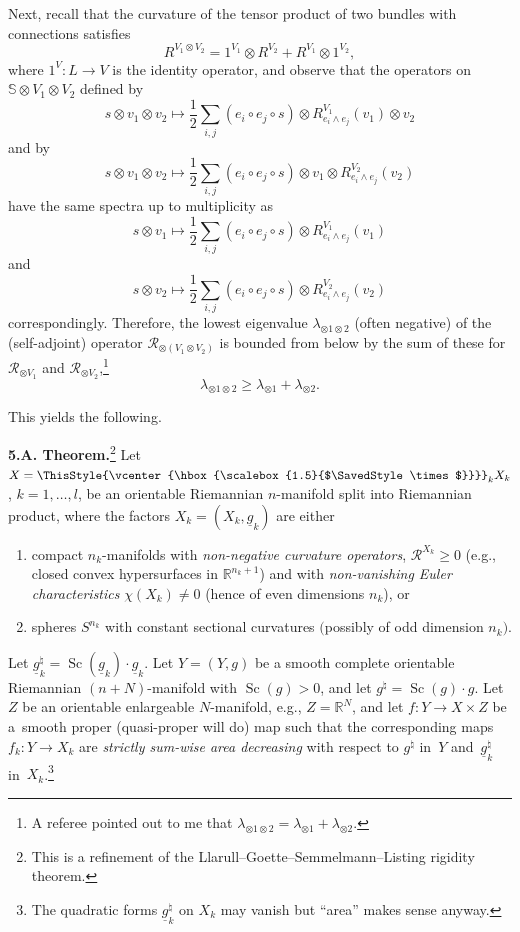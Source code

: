 \documentclass[10pt,a4paper]{amsart}
\numberwithin{equation}{section}
\newcommand\bigtimes{\mathbin{\ThisStyle{\vcenter{\hbox{%
\scalebox{1.5}{$\SavedStyle\times$}}}}}}
\begin{document}
Next, recall that the curvature of the tensor product of two bundles with connections satisfies
\[
R^{V_1\otimes V_2}=1^{V_1}\otimes R^{ V_2}+R^{V_1}\otimes 1^{V_2},
\]
where $1^V\colon L\to V$ is the identity operator, and observe that
 the operators on $\mathbb S\otimes V_1\otimes V_2$ defined by
\[
s\otimes v_1\otimes v_2\mapsto \frac {1}{2}\sum_{i,j}(e_i\circ e_j\circ s)
 \otimes R^{V_1}_{e_i\wedge e_j}(v_1)\otimes v_2
 \]
and by
\[
s\otimes v_1\otimes v_2\mapsto \frac {1}{2}\sum_{i,j}(e_i\circ e_j\circ s)
 \otimes v_1\otimes R^{V_2}_{e_i\wedge e_j}(v_2)
 \]
have the same spectra up to multiplicity as
\[
s\otimes v_1\mapsto \frac {1}{2}\sum_{i,j}(e_i\circ e_j\circ s) \otimes R^{V_1}_{e_i\wedge e_j}(v_1)
\]
and
\[
s\otimes v_2\mapsto \frac {1}{2}\sum_{i,j}(e_i\circ e_j\circ s)
 \otimes R^{V_2}_{e_i\wedge e_j}(v_2)
\]
correspondingly.
Therefore, the lowest eigenvalue $\lambda_{\otimes1\otimes 2} $ (often negative) of the (self-adjoint) operator $\mathcal R_{\otimes (V_1\otimes V_2)}$ is bounded from below by the sum of these for
$\mathcal R_{\otimes V_1}$ and $\mathcal R_{\otimes V_2}$,\footnote{A referee pointed out to me that $\lambda_{\otimes 1\otimes 2}= \lambda_{\otimes 1}+\lambda_{\otimes 2}$.}
\[
\lambda_{\otimes 1\otimes 2}\geq \lambda_{\otimes 1}+\lambda_{\otimes 2}.
\]

This yields the following.


\textbf {5.A. Theorem.}\footnote{This is a refinement of the Llarull--Goette--Semmelmann--Listing rigidity theorem.}
Let $X=\bigtimes_k X_k$, $k=1,\dots,l$, be an orientable Riemannian $n$-manifold split into Riemannian product, where the factors $X_k =(X_k,\underline g_k)$ are
either
\begin{enumerate}\itemsep=0pt
\item[(a)] compact $n_k$-manifolds with {\it non-negative curvature operators}, $\mathcal R^{X_k}\geq 0$ (e.g., closed convex hypersurfaces in $\mathbb R^{n_k+1}$)
 and with {\it non-vanishing Euler characteristics} $\chi(X_k)\neq 0$ (hence of even dimensions $n_k$),
 or
\item[(b)] spheres $S^{n_k}$ with constant sectional curvatures $($possibly of odd dimension $n_k)$.
\end{enumerate}

 Let $\underline g^\natural_k =\operatorname{Sc}(\underline g_k)\cdot \underline g_k$.
 Let $Y=(Y,g) $ be a smooth complete orientable Riemannian $(n+N)$-manifold with $\operatorname{Sc}(g) >0$,
and let $g^\natural =\operatorname{Sc}(g) \cdot g$.
Let
 $Z$ be an orientable enlargeable $N$-manifold, e.g., $Z=\mathbb R^N$,
and let
$f\colon Y\to X\times Z$ be a~smooth proper (quasi-proper will do) map such that
the corresponding maps $f_k\colon Y\to X_k$ are {\it strictly sum-wise area decreasing} with respect to $g^\natural$
in~$Y$ and~$\underline g^\natural_k $ in~$X_k$.\footnote{The quadratic forms $\underline g^\natural_k$ on $ X_k$ may vanish but ``area'' makes sense anyway.}
\end{document}

